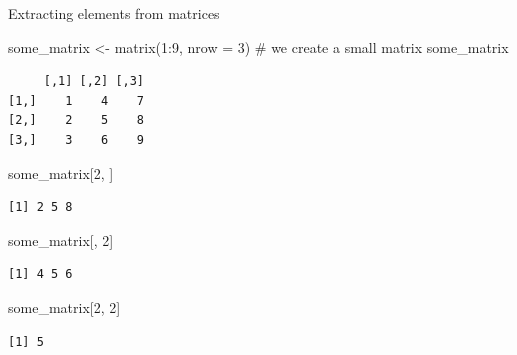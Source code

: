\documentclass[
  ignorenonframetext,
  aspectratio=169,
]{beamer}
\newenvironment{Shaded}{\begin{snugshade}}{\end{snugshade}}
\newcommand{\AttributeTok}[1]{\textcolor[rgb]{0.40,0.45,0.13}{#1}}
\newcommand{\CommentTok}[1]{\textcolor[rgb]{0.37,0.37,0.37}{#1}}
\newcommand{\DecValTok}[1]{\textcolor[rgb]{0.68,0.00,0.00}{#1}}
\newcommand{\FunctionTok}[1]{\textcolor[rgb]{0.28,0.35,0.67}{#1}}
\newcommand{\NormalTok}[1]{\textcolor[rgb]{0.00,0.23,0.31}{#1}}
\newcommand{\OtherTok}[1]{\textcolor[rgb]{0.00,0.23,0.31}{#1}}
\newcommand{\SpecialCharTok}[1]{\textcolor[rgb]{0.37,0.37,0.37}{#1}}
\begin{document}
\begin{frame}[fragile]{Extracting elements from matrices}
\protect{}\label{extracting-elements-from-matrices}
\footnotesize

\begin{Shaded}
\begin{Highlighting}[]
\NormalTok{some\_matrix }\OtherTok{\textless{}{-}} \FunctionTok{matrix}\NormalTok{(}\DecValTok{1}\SpecialCharTok{:}\DecValTok{9}\NormalTok{, }\AttributeTok{nrow =} \DecValTok{3}\NormalTok{) }\CommentTok{\# we create a small matrix}
\NormalTok{some\_matrix}
\end{Highlighting}
\end{Shaded}

\begin{verbatim}
     [,1] [,2] [,3]
[1,]    1    4    7
[2,]    2    5    8
[3,]    3    6    9
\end{verbatim}

\begin{Shaded}
\begin{Highlighting}[]
\NormalTok{some\_matrix[}\DecValTok{2}\NormalTok{, ]}
\end{Highlighting}
\end{Shaded}

\begin{verbatim}
[1] 2 5 8
\end{verbatim}

\begin{Shaded}
\begin{Highlighting}[]
\NormalTok{some\_matrix[, }\DecValTok{2}\NormalTok{]}
\end{Highlighting}
\end{Shaded}

\begin{verbatim}
[1] 4 5 6
\end{verbatim}

\begin{Shaded}
\begin{Highlighting}[]
\NormalTok{some\_matrix[}\DecValTok{2}\NormalTok{, }\DecValTok{2}\NormalTok{]}
\end{Highlighting}
\end{Shaded}

\begin{verbatim}
[1] 5
\end{verbatim}

\normalsize
\end{frame}
\end{document}
